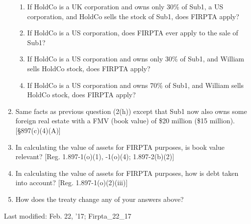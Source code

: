 \begin{select}
\begin{enumerate}
\begin{enumerate}
						\item If HoldCo is a UK corporation and owns only 30\% of Sub1, a US corporation, and HoldCo sells the stock of Sub1, does FIRPTA apply?
						\item If HoldCo is a US corporation, does FIRPTA ever apply to the sale of Sub1?
									\item If HoldCo is a US corporation and owns only 30\% of Sub1, and William sells HoldCo stock, does FIRPTA apply?
									\item If HoldCo is a US corporation and owns 70\% of Sub1, and William sells HoldCo stock, does FIRPTA apply?
					\end{enumerate}
\item Same facts as previous question (2(h)) except that Sub1 now also owns some foreign real estate with a FMV (book value) of \$20 million (\$15 million).  [\S 897(c)(4)(A)]

\item In calculating the value of assets for FIRPTA purposes, is book value relevant? [Reg. 1.897-1(o)(1), -1(o)(4); 1.897-2(b)(2)]
\item In calculating the value of assets for FIRPTA purposes, how is debt taken into account? [Reg. 1.897-1(o)(2)(iii)]   

				\item How does the treaty change any of your answers above?		
		\end{enumerate}
	\end{select}	
	
	
	

\begin{framed}
Last modified: Feb. 22, '17; Firpta\_22\_17
\end{framed}